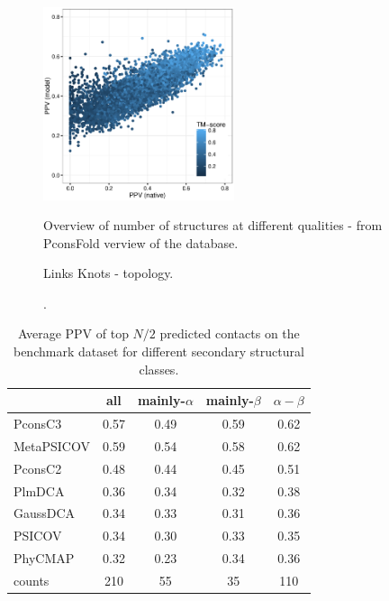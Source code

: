 \documentclass[a4,center,fleqn]{NAR}
\begin{document}
\begin{figure}[t]
\begin{center}
\end{center}
\caption{Overview of number of structures at different qualities - from PconsFold
verview of the database.}
    \includegraphics[width=0.5\textwidth]{figures/fig_pfam_ppv_native_vs_model.eps}
\label{fig:overview}
\end{figure}


\begin{figure}[t]
\begin{center}
\end{center}
\caption{Links Knots - topology.}
\label{fig:Interface}
\end{figure}


\begin{figure}[t]
\begin{center}
\end{center}
\caption{.}
\label{fig:exampel PF0009.24}
\end{figure}


\begin{table}[t!]
\centering
\caption{Average PPV of top $N/2$ predicted contacts on the benchmark dataset for different secondary structural classes. \label{tab:ss}}
{\begin{tabular}{lcccc}
  \hline
 & all & mainly-$\alpha$ & mainly-$\beta$ & $\alpha-\beta$ \\ 
  \hline
  PconsC3 & 0.57 & 0.49 & 0.59 & 0.62 \\ 
    MetaPSICOV & 0.59 & 0.54 & 0.58 & 0.62 \\ 
    PconsC2 & 0.48 & 0.44 & 0.45 & 0.51 \\ 
    PlmDCA & 0.36 & 0.34 & 0.32 & 0.38 \\ 
    GaussDCA & 0.34 & 0.33 & 0.31 & 0.36 \\ 
    PSICOV & 0.34 & 0.30 & 0.33 & 0.35 \\ 
    PhyCMAP & 0.32 & 0.23 & 0.34 & 0.36 \\ 
   \hline
  counts & 210 & 55 & 35 & 110 \\
   \hline
\end{tabular}}{}
\end{table}
\end{document}
